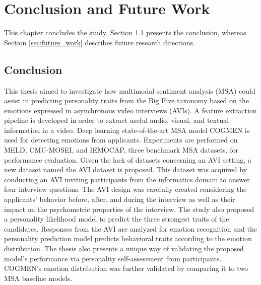 \chapter{Conclusion and Future Work}
\label{chap:conclusion}
This chapter concludes the study. Section \ref{sec:conclusion} presents the conclusion, whereas Section \ref{sec:future_work} describes future research directions.  

\section{Conclusion}
\label{sec:conclusion}
\begin{comment}
    As the labour is highly competitive, it is important for recruiters to select the most appropriate candidates with speed and accuracy. Asynchronous video interview (AVI) is the major component of the screening process. Recruiters aim to capture applicants' expressed emotions in the AVIs. However, the main limitation of this method originates from the underlying uncertainty of the human recognition of emotions. The aim of this thesis was to investigate how multimodal sentiment analysis (MSA) can assist in predicting the personality traits of candidates from the emotions expressed in AVIs. Deep learning state-of-the-art COGMEN architecture was utilized to detect emotions expressed in videos. Experiments were performed on MELD, CMU-MOSEI, and IEMOCAP, three benchmarks datasets in MSA. A novel personality likelihood model was proposed in the study. This prediction model was based on the emotion-personality relationship from previous works. The model uses the emotion distribution. \\
\end{comment}

This thesis aimed to investigate how multimodal sentiment analysis (MSA) could assist in predicting personality traits from the Big Five taxonomy based on the emotions expressed in asynchronous video interviews (AVIs). A feature extraction pipeline is developed in order to extract useful audio, visual, and textual information in a video. Deep learning state-of-the-art MSA model COGMEN is used for detecting emotions from applicants. Experiments are performed on MELD, CMU-MOSEI, and IEMOCAP, three benchmark MSA datasets, for performance evaluation. Given the lack of datasets concerning an AVI setting, a new dataset named the AVI dataset is proposed. This dataset was acquired by conducting an AVI inviting participants from the informatics domain to answer four interview questions. The AVI design was carefully created considering the applicants' behavior before, after, and during the interview as well as their impact on the psychometric properties of the interview. The study also proposed a personality likelihood model to predict the three strongest traits of the candidates. Responses from the AVI are analyzed for emotion recognition and the personality prediction model predicts behavioral traits according to the emotion distribution. The thesis also presents a unique way of validating the proposed model's performance via personality self-assessment from participants. COGMEN's emotion distribution was further validated by comparing it to two MSA baseline models. \\

